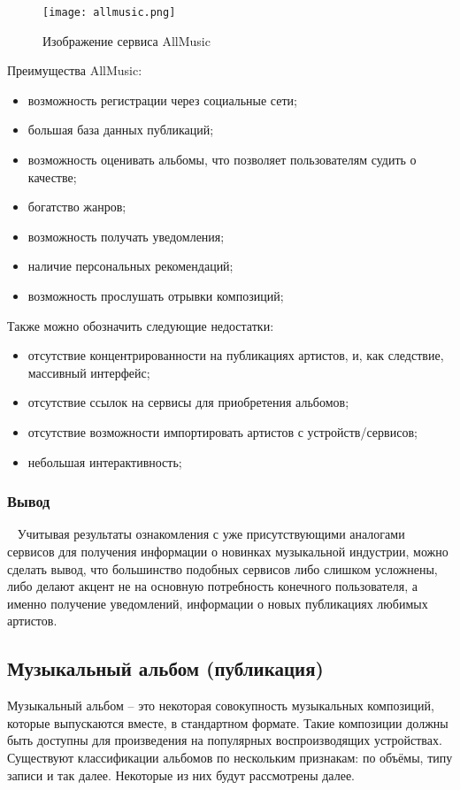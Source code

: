 \begin{figure}[ht]
\centering
  \texttt{[image: allmusic.png]}
  \caption{ Изображение сервиса AllMusic }
  \label{fig:domain:allmusic:picture}
\end{figure}

Преимущества AllMusic:

\begin{itemize}
  \item возможность регистрации через социальные сети;
  \item большая база данных публикаций;
  \item возможность оценивать альбомы, что позволяет пользователям судить о качестве;
  \item богатство жанров;
  \item возможность получать уведомления;
  \item наличие персональных рекомендаций;
  \item возможность прослушать отрывки композиций;
\end{itemize}

Также можно обозначить следующие недостатки:

\begin{itemize}
  \item отсутствие концентрированности на публикациях артистов, и, как следствие, массивный интерфейс;
  \item отсутствие ссылок на сервисы для приобретения альбомов;
  \item отсутствие возможности импортировать артистов с устройств/сервисов;
  \item небольшая интерактивность;
\end{itemize}

\subsubsection{Вывод}
~\label{sub:domain:analogues_review:conclusion}
\newline
\indent Учитывая результаты ознакомления с уже присутствующими аналогами сервисов для получения информации о новинках музыкальной индустрии, можно сделать вывод, что большинство подобных сервисов либо слишком усложнены, либо делают акцент не на основную потребность конечного пользователя, а именно получение уведомлений, информации о новых публикациях любимых артистов.

\subsection{Музыкальный альбом (публикация)}
\label{sub:domain:music_album}
Музыкальный альбом -- это некоторая совокупность музыкальных композиций, которые выпускаются вместе, в стандартном формате. Такие композиции должны быть доступны для произведения на популярных воспроизводящих устройствах.
Существуют классификации альбомов по нескольким признакам: по объёмы, типу записи и так далее. Некоторые из них будут рассмотрены далее.

